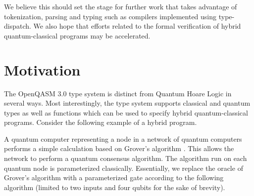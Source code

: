\documentclass{article}
\begin{document}
We believe this should set the stage for further work that takes advantage of tokenization, parsing and typing such as compilers implemented using type-dispatch. We also hope that efforts related to the formal verification of hybrid quantum-classical programs may be accelerated.

\section{Motivation}

The OpenQASM 3.0 type system is distinct from Quantum Hoare Logic in several ways. Most interestingly, the type system supports classical and quantum types as well as functions which can be used to specify hybrid quantum-classical programs. Consider the following example of a hybrid program.

A quantum computer representing a node in a network of quantum computers performs a simple calculation based on Grover's algorithm \cite{edwards2023quantumhonestbyzantineagreement}. This allows the network to perform a quantum consensus algorithm. The algorithm run on each quantum node is parameterized classically. Essentially, we replace the oracle of Grover's algorithm with a parameterized gate according to the following algorithm (limited to two inputs and four qubits for the sake of brevity).
\end{document}
